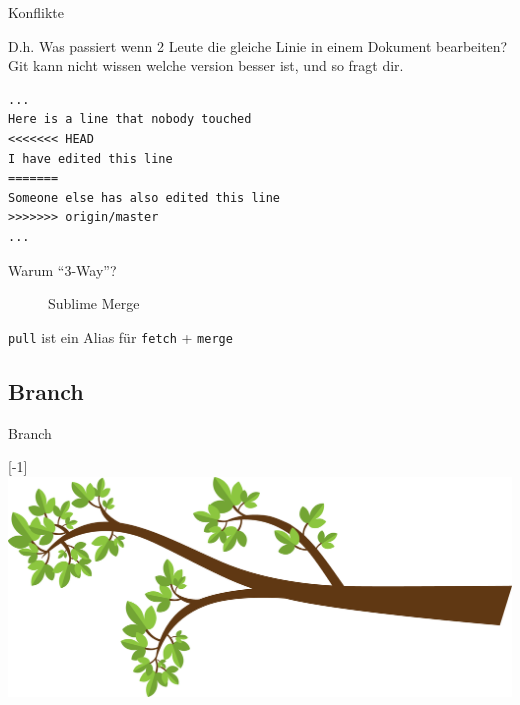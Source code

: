 \documentclass[xetex, handout]{beamer}
\begin{document}
\begin{frame}[fragile]{Konflikte}
  \begin{block}{}
  D.h. Was passiert wenn 2 Leute die gleiche Linie in einem Dokument bearbeiten?
  \\
  \pause
  \vspace{1em}
  Git kann nicht wissen welche version besser ist, und so fragt dir.
  \end{block}
  \begin{verbatim}
...
Here is a line that nobody touched
<<<<<<< HEAD
I have edited this line
=======
Someone else has also edited this line
>>>>>>> origin/master
...\end{verbatim}
\end{frame}
\begin{frame}{Warum ``3-Way''?}
  \begin{center}
  \begin{figure}
  \caption{Sublime Merge}
  \end{figure}
  \end{center}

  \pause
  \begin{center}
  \Large
  \texttt{pull} ist ein Alias f\"ur \texttt{fetch} + \texttt{merge}
  \end{center}
\end{frame}

\subsection{Branch}
\begin{frame}[c]{Branch}
  \begin{center}
  \scalebox{-1}[-1]{\includegraphics[width=\textwidth]{pic/treebranch}}
  \end{center}
\end{frame}
\end{document}
